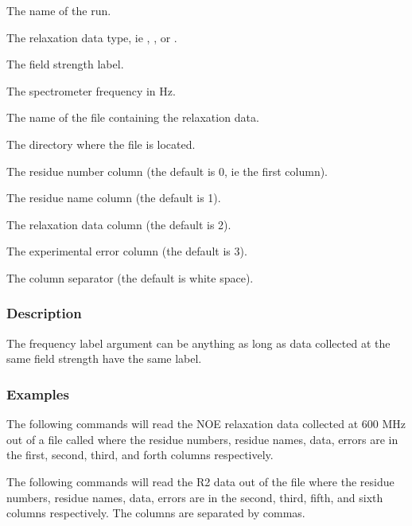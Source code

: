   The name of the run.

  The relaxation data type, ie 
, 
, or 
.

  The field strength label.

  The spectrometer frequency in Hz.

  The name of the file containing the relaxation data.

  The directory where the file is located.

  The residue number column (the default is 0, ie the first column).

  The residue name column (the default is 1).

  The relaxation data column (the default is 2).

  The experimental error column (the default is 3).

  The column separator (the default is white space).

\subsubsection{Description}

The frequency label argument can be anything as long as data collected at the same field
strength have the same label.


\subsubsection{Examples}

The following commands will read the NOE relaxation data collected at 600 MHz out of a file
called 
 where the residue numbers, residue names, data, errors are in the
first, second, third, and forth columns respectively.





The following commands will read the R2 data out of the file 
 where the residue
numbers, residue names, data, errors are in the second, third, fifth, and sixth columns
respectively.  The columns are separated by commas.

